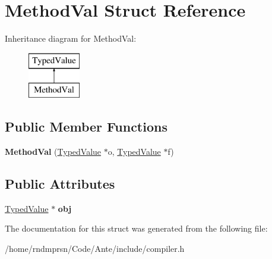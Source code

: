 \hypertarget{structMethodVal}{}\section{Method\+Val Struct Reference}
\label{structMethodVal}
Inheritance diagram for Method\+Val\+:\begin{figure}[H]
\begin{center}
\leavevmode
\includegraphics[height=2.000000cm]{structMethodVal}
\end{center}
\end{figure}
\subsection*{Public Member Functions}
\begin{DoxyCompactItemize}
\item 
\mbox{\label{structMethodVal_aacc2e3d238ee7589816a6ddf493b8653}} 
{\bfseries Method\+Val} (\hyperlink{structTypedValue}{Typed\+Value} $\ast$o, \hyperlink{structTypedValue}{Typed\+Value} $\ast$f)
\end{DoxyCompactItemize}
\subsection*{Public Attributes}
\begin{DoxyCompactItemize}
\item 
\mbox{\label{structMethodVal_a60af988d02eacfb613edcfe38c13e1af}} 
\hyperlink{structTypedValue}{Typed\+Value} $\ast$ {\bfseries obj}
\end{DoxyCompactItemize}


The documentation for this struct was generated from the following file\+:\begin{DoxyCompactItemize}
\item 
/home/rndmprsn/\+Code/\+Ante/include/compiler.\+h\end{DoxyCompactItemize}
